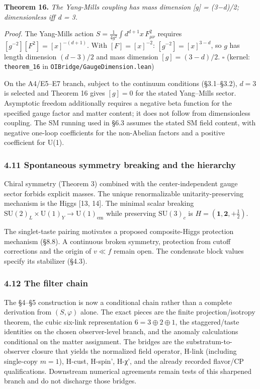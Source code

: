 \documentclass[
]{article}
\begin{document}
\textbf{Theorem 16.} \emph{The Yang-Mills coupling has mass dimension
{[}g{]} = (3−d)/2; dimensionless iff d = 3.}

\emph{Proof.} The Yang-Mills action
\(S = \frac{1}{4g^2}\int d^{d+1}x\,F_{\mu\nu}^2\) requires
\([g^{-2}][F^2] = [x]^{-(d+1)}\). With \([F] = [x]^{-2}\):
\([g^{-2}] = [x]^{3-d}\), so \(g\) has length dimension \((d-3)/2\) and
mass dimension \([g] = (3-d)/2\). \(\square\) (kernel:
\texttt{theorem\_16} in \texttt{OIBridge/GaugeDimension.lean})

On the A4/E5--E7 branch, subject to the continuum conditions
(§3.1--§3.2), \(d = 3\) is selected and Theorem 16 gives \([g] = 0\) for
the stated Yang--Mills sector. Asymptotic freedom additionally requires
a negative beta function for the specified gauge factor and matter
content; it does not follow from dimensionless coupling. The SM running
used in §6.3 assumes the stated SM field content, with negative one-loop
coefficients for the non-Abelian factors and a positive coefficient for
U(1).

\hypertarget{spontaneous-symmetry-breaking-and-the-hierarchy}{%
\subsubsection{4.11 Spontaneous symmetry breaking and the
hierarchy}\label{spontaneous-symmetry-breaking-and-the-hierarchy}}

Chiral symmetry (Theorem 3) combined with the center-independent gauge
sector forbids explicit masses. The unique renormalizable
unitarity-preserving mechanism is the Higgs {[}13, 14{]}. The minimal
scalar breaking
\(\mathrm{SU}(2)_L \times \mathrm{U}(1)_Y \to \mathrm{U}(1)_{\text{em}}\)
while preserving \(\mathrm{SU}(3)_c\) is
\(H = (\mathbf{1}, \mathbf{2}, +\tfrac{1}{2})\).

The singlet-taste pairing motivates a proposed composite-Higgs
protection mechanism (§8.8). A continuous broken symmetry, protection
from cutoff corrections and the origin of \(v \ll f\) remain open. The
condensate block values specify its stabilizer (§4.3).

\hypertarget{the-filter-chain}{%
\subsubsection{4.12 The filter chain}\label{the-filter-chain}}

The §4--§5 construction is now a conditional chain rather than a
complete derivation from \((S,\varphi)\) alone. The exact pieces are the
finite projection/isotropy theorem, the cubic six-link representation
\(6=3\oplus2\oplus1\), the staggered/taste identities on the chosen
observer-level branch, and the anomaly calculations conditional on the
matter assignment. The bridges are the substratum-to-observer closure
that yields the normalized field operator, H-link (including single-copy
\(m=1\)), H-cust, H-spin', H-χ', and the already recorded flavor/CP
qualifications. Downstream numerical agreements remain tests of this
sharpened branch and do not discharge those bridges.
\end{document}
